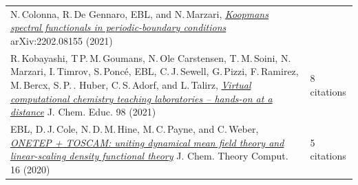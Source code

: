 \documentclass[10pt,a4paper,final]{article}
\begin{document}
\begin{tabularx}{\textwidth}{
      m{}%
      m{}}
   N.\,Colonna, R.\,De Gennaro, EBL, and N.\,Marzari, \href{https://arxiv.org/abs/2202.08155}{\textit{Koopmans spectral functionals in periodic-boundary conditions}} arXiv:2202.08155 (2021)                                                                                                                                                                                                                                                                                                                                                                                                                                                                                                                                                                 &                                                 \\
   R.\,Kobayashi, T\,P.\,M.\,Goumans, N.\,Ole Carstensen, T.\,M.\,Soini, N.\,Marzari, I.\,Timrov, S.\,Ponc\'e, EBL, C.\,J.\,Sewell, G.\,Pizzi, F.\,Ramirez, M.\,Bercx, S.\,P.\,. Huber, C.\,S.\,Adorf, and L.\,Talirz, \href{https://doi.org/10.1021/acs.jchemed.1c00655}{\textit{Virtual computational chemistry teaching laboratories – hands-on at a distance}} J. Chem. Educ. 98 (2021)                                                                                                                                                                                                                                                                                                                                                                   & 8 citations                                     \\
   EBL, D.\,J.\,Cole, N.\,D.\,M.\,Hine, M.\,C.\,Payne, and C.\,Weber, \href{https://doi.org/10.1021/acs.jctc.0c00162}{\textit{ONETEP + TOSCAM: uniting dynamical mean field theory and linear-scaling density functional theory}} J. Chem. Theory Comput. 16 (2020)                                                                                                                                                                                                                                                                                                                                                                                                                                                                                           & 5 citations                                     \\

\end{tabularx}
\end{document}
